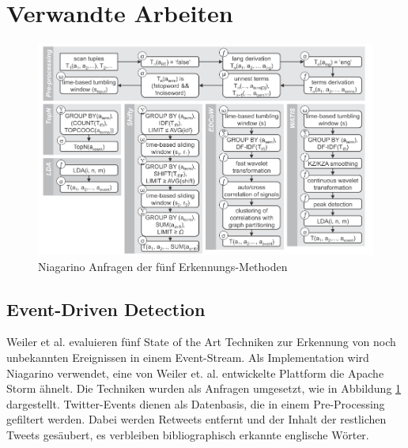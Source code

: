 \section{Verwandte Arbeiten}

\begin{figure}
    \includegraphics[width=\textwidth]{images/eventdetect.png}
    \caption{Niagarino Anfragen der fünf Erkennungs-Methoden}
    \label{fig:eventdetect}
\end{figure}

\subsection{Event-Driven Detection}
Weiler et al. \cite{weiler2016evaluation} evaluieren fünf State of the Art Techniken zur Erkennung von noch unbekannten Ereignissen in einem Event-Stream. Als Implementation wird Niagarino verwendet, eine von Weiler et. al. entwickelte Plattform die Apache Storm ähnelt. Die Techniken wurden als Anfragen umgesetzt, wie in Abbildung \ref{fig:eventdetect} dargestellt. Twitter-Events dienen als Datenbasis, die in einem Pre-Processing gefiltert werden. Dabei werden Retweets entfernt und der Inhalt der restlichen Tweets gesäubert, es verbleiben bibliographisch erkannte englische Wörter.

